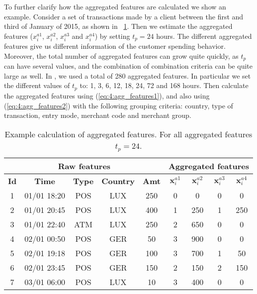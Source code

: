   To further clarify how the aggregated features are calculated we show an example. Consider a set 
  of transactions made by a client between the first and third of January of 2015, as shown in 
  \tablename{~\ref{tab:4:agg_features_example1}}. Then we estimate the aggregated features 
  ($x_i^{a1}$, $x_i^{a2}$, $x_i^{a3}$ and $x_i^{a4}$) by setting $t_p=24$ hours. The 
  different aggregated features give us different information of the customer spending   behavior. 
  Moreover, the total number of aggregated features can grow quite quickly, as $t_p$   can have   
  several values, and the combination of combination criteria can be quite large as well.
  In \cite{CorreaBahnsen2013}, we used a total of 280 aggregated features. In particular we set the 
  different values of $t_p$ to: 1, 3, 6, 12, 18, 24, 72 and 168 hours. Then calculate the 
  aggregated features   using (\ref{eq:4:agg_features1}), and also using (\ref{eq:4:agg_features2}) 
  with the following  grouping criteria:  country, type of transaction, entry mode, merchant code 
  and merchant group.
  
	\begin{table}[!t]
		\centering
    \footnotesize
   \begin{tabular}{|c c c c c | c c c c|}
   \hline
   \multicolumn{5}{|c|}{\textbf{Raw features}} & \multicolumn{4}{c|}{\textbf{Aggregated features}} 
		\\  \hline
   \textbf{Id} &\textbf{Time} & \textbf{Type} & \textbf{Country} & 
	\textbf{Amt} 		& $\mathbf{x}_i^{a1}$& $\mathbf{x}_i^{a2}$ & $\mathbf{x}_i^{a3}$ & 
$\mathbf{x}_i^{a4}$\\
   \hline
		1&  01/01 18:20& POS & LUX & 250 & 0 & 0  & 0 & 0\\
		2& 01/01 20:45& POS & LUX & 400 & 1 & 250& 1 & 250\\
		3& 01/01 22:40& ATM & LUX & 250 & 2 & 650& 0 & 0\\
		4&02/01 00:50& POS & GER & 50 		& 3 & 900& 0& 0\\
		5& 02/01 19:18& POS & GER & 100 	  & 3 & 700& 1& 50\\
		6& 02/01 23:45& POS & GER & 150 	  & 2 & 150& 2& 150\\
		7& 03/01 06:00& POS & LUX & 10  & 3 & 400& 0& 0\\
   \hline
   \end{tabular}
		\caption{Example calculation of aggregated features. For all aggregated features $t_p=24$.}
		\label{tab:4:agg_features_example1}
  \end{table}
	
